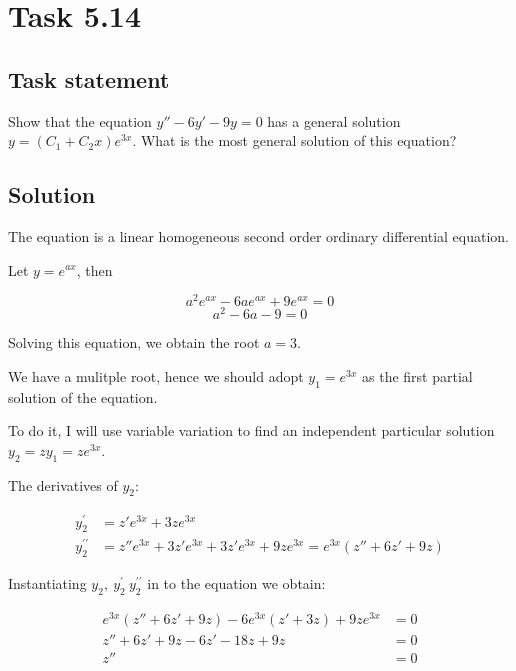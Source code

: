 \section*{Task 5.14}

\subsection*{Task statement}

Show that the equation $y'' - 6y' - 9y = 0$ has a general solution $y = (C_1 + C_2 x)e^{3x}$. What is the most general solution of this
equation?

\subsection*{Solution}

The equation is a linear homogeneous second order ordinary differential equation.

Let $y = e^{ax}$, then

\[a^2 e^{ax} - 6a e^{ax} + 9 e^{ax} = 0\]
\[a^2 - 6a - 9 = 0\]

Solving this equation, we obtain the root $a = 3$.

We have a mulitple root, hence we should adopt $y_1 = e^{3x}$ as the first partial solution of the equation.

To do it, I will use variable variation to find an independent particular solution $y_2 = zy_1 = ze^{3x}$.

The derivatives of $y_2$:

\begin{displaymath}
    \begin{aligned}
        y_2^{\prime} & = z' e^{3x} + 3z e^{3x} \\
        y_2^{\prime \prime} & = z'' e^{3x} + 3z' e^{3x} + 3z' e^{3x} + 9z e^{3x} = e^{3x}(z'' + 6z' + 9z)
    \end{aligned}
\end{displaymath}

Instantiating $y_2,\ y_2^{\prime} \ y_2^{\prime \prime}$ in to the equation we obtain:

\begin{displaymath}
    \begin{aligned}
        e^{3x}(z'' + 6z' + 9z) - 6e^{3x} (z' + 3z) + 9ze^{3x} & = 0 \\
        z'' + 6z' + 9z - 6z' - 18z + 9z & = 0 \\
        z'' & = 0 
    \end{aligned}
\end{displaymath}

